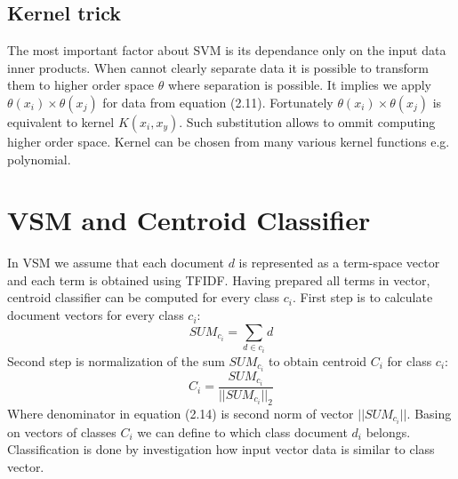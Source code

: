 \subsection{Kernel trick}
The most important factor about SVM is its dependance only on the input data inner products.\cite{6} When cannot clearly separate data it is possible to transform them to higher order space $\theta$ where separation is possible. It implies we apply $\theta(x_i) \times \theta(x_j)$ for data from equation (2.11). Fortunately $\theta(x_i) \times \theta(x_j)$ is equivalent to kernel $K(x_i,x_y)$. Such substitution allows to ommit computing higher order space. Kernel can be chosen from many various kernel functions e.g. polynomial. \cite{svm_wiki}

\section{VSM and Centroid Classifier}
In VSM we assume that each document $d$ is represented as a term-space vector and each term is obtained using TFIDF. Having prepared all terms in vector, centroid classifier can be computed for every class $c_i$\cite{8}.
\newline First step is to calculate document vectors for every class $c_i$:
\begin{equation}
SUM_{c_i} = \sum_{d\in c_i}d
\end{equation}
\newline Second step is normalization of the sum $SUM_{c_i}$ to obtain centroid $C_i$ for class $c_i$:
\begin{equation}
C_i = \frac{SUM_{c_i}}{||SUM_{c_i}||_2}
\end{equation}
Where denominator in equation (2.14) is second norm of vector $||SUM_{c_i}||$. Basing on vectors of classes $C_i$ we can define to which class document $d_i$ belongs. Classification is done by investigation how input vector data is similar to class vector. 




